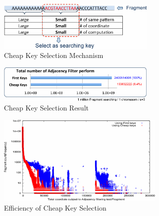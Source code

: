 \begin{figure}[h] \centering \vspace{0.1in}
\includegraphics[width=3.0in]{./figure/Cheap_Key_B.pdf} \vspace{0in}
\caption{Cheap Key Selection Mechanism} 
\label{fig:cheap_key} 
\end{figure}
\begin{figure}[b] \centering \vspace{0.1in}
\includegraphics[width=3.0in]{./figure/CK_Result_B.pdf} \vspace{0in}
\caption{Cheap Key Selection Result} 
\label{fig:ck_result} 
\end{figure}
\begin{figure}[t] \centering \vspace{0.1in}
\includegraphics[height=1.7in]{./figure/Key_Dist2_B.pdf} \vspace{0in}
\caption{Efficiency of Cheap Key Selection} 
\label{fig:key_dist2} 
\end{figure}


